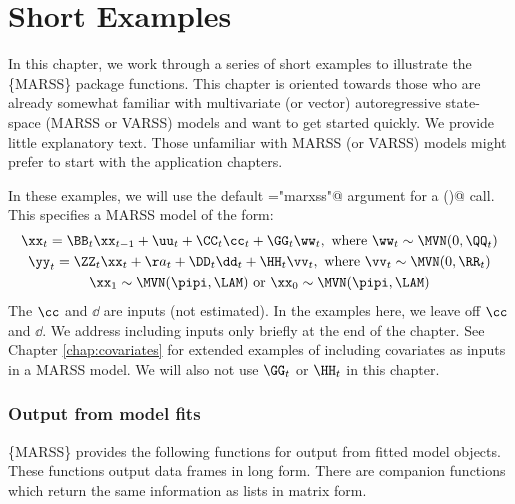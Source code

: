 
\chapter{Short Examples}
\label{chap:Examples}




In this chapter, we work through a series of short examples to illustrate the \{MARSS\} package functions.  This chapter is oriented towards those who are already somewhat familiar with multivariate (or vector) autoregressive state-space (MARSS or VARSS) models and want to get started quickly.  We provide little explanatory text.  Those unfamiliar with MARSS (or VARSS) models might prefer to start with the application chapters. 

In these examples, we will use the default \verb@form="marxss"@ argument for a \verb@MARSS()@ call.  This specifies a MARSS model of the form:
\begin{subequations}\label{eqn:marss.qe}
\begin{gather}
\xx_t = \BB_t\xx_{t-1} + \uu_t + \CC_t\cc_t + \GG_t\ww_t, \text{ where } \ww_t \sim \MVN(0,\QQ_t)\\
\yy_t = \ZZ_t\xx_t + \aa_t + \DD_t\dd_t + \HH_t\vv_t, \text{ where } \vv_t \sim \MVN(0,\RR_t)\\
\xx_1 \sim \MVN(\pipi,\LAM) \text{ or } \xx_0 \sim \MVN(\pipi,\LAM)
\end{gather}
\end{subequations} 
The $\cc$ and $\dd$ are inputs (not estimated).  In the examples here, we leave off $\cc$ and $\dd$.  We address including inputs only briefly at the end of the chapter.  See Chapter \ref{chap:covariates} for extended examples of including covariates as inputs in a MARSS model.  We will also not use $\GG_t$ or $\HH_t$ in this chapter. 

\subsection{Output from model fits}

\{MARSS\} provides the following functions for output from fitted model objects. These functions output data frames in long form. There are companion functions which return the same information as lists in matrix form.

